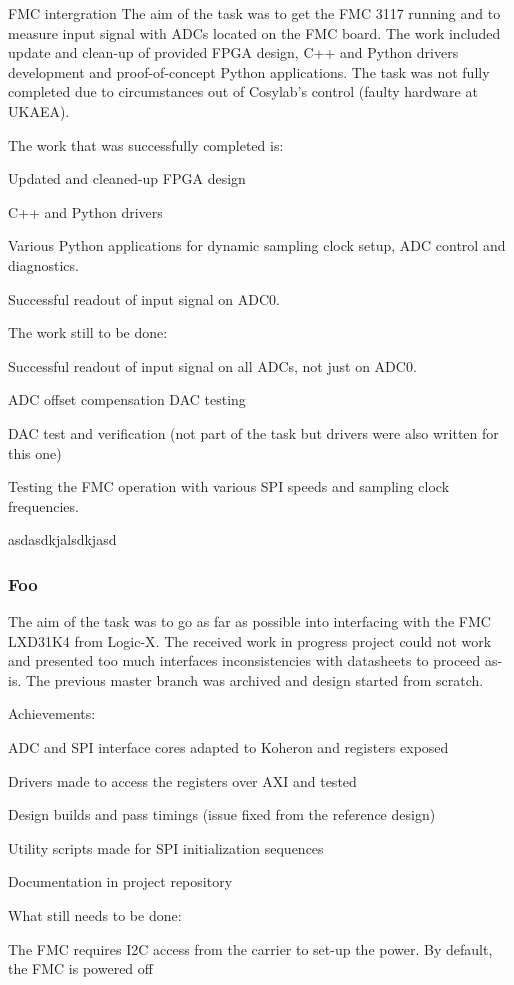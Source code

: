 \documentclass[preprint]{elsarticle}
\begin{document}
FMC intergration 
The aim of the task was to get the FMC 3117 running and to measure input signal with ADCs located on the FMC board. The work included update and clean-up of provided FPGA design, C++ and Python drivers development and proof-of-concept Python applications. The task was not fully completed due to circumstances out of Cosylab’s control (faulty hardware at UKAEA).

The work that was successfully completed is:

Updated and cleaned-up FPGA design

C++ and Python drivers

Various Python applications for dynamic sampling clock setup, ADC control and diagnostics.

Successful readout of input signal on ADC0.

The work still to be done:

Successful readout of input signal on all ADCs, not just on ADC0.

ADC offset compensation DAC testing

DAC test and verification (not part of the task but drivers were also written for this one)

Testing the FMC operation with various SPI speeds and sampling clock frequencies.


asdasdkjalsdkjasd

\subsubsection{Foo}
The aim of the task was to go as far as possible into interfacing with the FMC LXD31K4 from Logic-X. The received work in progress project could not work and presented too much interfaces inconsistencies with datasheets to proceed as-is. The previous master branch was archived and design started from scratch.

Achievements:

ADC and SPI interface cores adapted to Koheron and registers exposed

Drivers made to access the registers over AXI and tested

Design builds and pass timings (issue fixed from the reference design)

Utility scripts made for SPI initialization sequences

Documentation in project repository

What still needs to be done:

The FMC requires I2C access from the carrier to set-up the power. By default, the FMC is powered off
\end{document}

